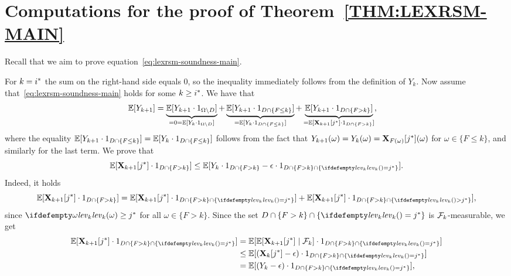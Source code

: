 
\section{Computations for the proof of Theorem~\ref{THM:LEXRSM-MAIN}}

Recall that we aim to prove equation~\eqref{eq:lexrsm-soundness-main}.

For 
$k={i}^*$ the sum on the right-hand side equals $0$, so the 
inequality immediately follows from the definition of $Y_k$. Now assume 
that~\eqref{eq:lexrsm-soundness-main} holds for some $k\geq {i}^*$. We have that 
\begin{align}
\label{eq:lexrsm-ind-1}
\mathbb{E}[Y_{k+1}] &= \underbrace{\mathbb{E}[Y_{k+1}\cdot {1}_{\Omega\setminus D}]}_{=0=\mathbb{E}[Y_k\cdot{1}_{\Omega\setminus D}]} +  \underbrace{\mathbb{E}[Y_{k+1}\cdot {1}_{D \cap \{F \leq k\}}]}_{=\mathbb{E}[Y_k\cdot{1}_{D\cap \{F\leq k\}}]} + \underbrace{\mathbb{E}[Y_{k+1}\cdot {1}_{D \cap \{F > k\}}]}_{=\mathbb{E}[\mathbf{X}_{k+1}[{j}^*]\cdot{1}_{D\cap \{F>k \} }]},
\end{align}
where the equality $\mathbb{E}[Y_{k+1}\cdot {1}_{D \cap \{F \leq k\}}] =\mathbb{E}[Y_k\cdot{1}_{D\cap \{F\leq k\}}] $ follows from the fact that $Y_{k+1}(\omega)=Y_k({\omega})=\mathbf{X}_{F(\omega)}[{j}^*](\omega)$ for $\omega\in \{F\leq k\}$, and similarly for the last term. We prove that 
\begin{equation}
\label{eq:lexrsm-ind-2}
\E[\vecseq{X}{k+1}{\fixn{j}}\cdot \indicator{D\cap \{F > k \}}] \leq \E[Y_k\cdot \indicator{D\cap \{F > k \}} -\eps\cdot \indicator{D\cap \{F>k\} \cap \{\levelrank{}{k}= \fixn{j}\} }] .
\end{equation}
Indeed, it holds
\begin{equation}
\label{eq:lexrsm-ind-3}
\E[\vecseq{X}{k+1}{\fixn{j}}\cdot \indicator{D\cap \{F > k \}}] = \E[\vecseq{X}{k+1}{\fixn{j}}\cdot \indicator{D\cap \{F > k \} \cap \{\levelrank{}{k}=\fixn{j} \} }]  + \E[\vecseq{X}{k+1}{\fixn{j}}\cdot \indicator{D\cap \{F > k \} \cap \{\levelrank{}{k}>\fixn{j}\} }], 
\end{equation}
since $\levelrank{\omega}{k}\geq \fixn{j}$ for all $\omega \in \{F>k\}$. Since the set $D\cap \{F > k \} \cap \{\levelrank{}{k}=\fixn{j} \}$ is $\mathcal{F}_k$-measurable, we get
\begin{align}
\E[\vecseq{X}{k+1}{\fixn{j}}\cdot \indicator{D\cap \{F > k \} \cap \{\levelrank{}{k}=\fixn{j} \} }] &= \E[\E[\vecseq{X}{k+1}{\fixn{j}}\mid \genfilt_k]\cdot \indicator{D\cap \{F > k \} \cap \{\levelrank{}{k}=\fixn{j} \} }] \label{eq:lexrsm-ind-4}\\
&\leq \E[(\vecseq{X}{k}{\fixn{j}} - \eps)\cdot \indicator{D\cap \{F > k \} \cap \{\levelrank{}{k}=\fixn{j} \}}] \label{eq:lexrsm-ind-5}\\
&=\E[(Y_k - \eps)\cdot \indicator{D\cap \{F > k \} \cap \{\levelrank{}{k}=\fixn{j} \}}] \label{eq:lexrsm-ind-6},
\end{align}

